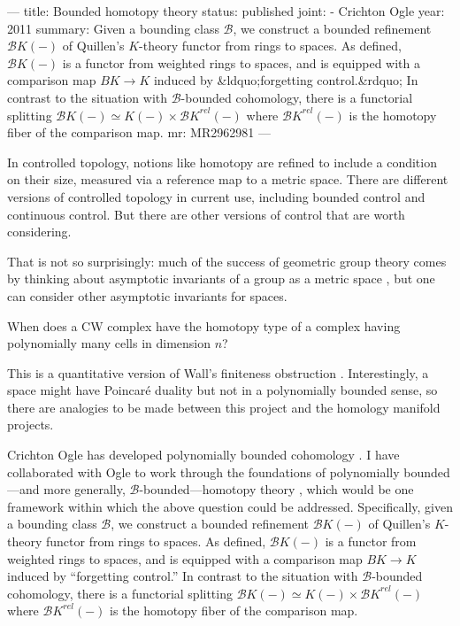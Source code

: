 ---
title: Bounded homotopy theory
status: published
joint:
  - Crichton Ogle
year: 2011
summary: Given a bounding class ${\mathcal B}$, we construct a bounded refinement ${\mathcal{B}K}(-)$ of Quillen's $K$-theory functor from rings to spaces. As defined, ${\mathcal{B}K}(-)$ is a functor from weighted rings to spaces, and is equipped with a comparison map $BK \to K$ induced by &ldquo;forgetting control.&rdquo; In contrast to the situation with $\mathcal{B}$-bounded cohomology, there is a functorial splitting ${\mathcal{B}K}(-) \simeq K(-) \times {\mathcal{B}K}^{rel}(-)$ where ${\mathcal{B}K}^{rel}(-)$ is the homotopy fiber of the comparison map.
mr: MR2962981
---

In controlled topology, notions like homotopy are refined to include a condition on their size, measured via a reference map to a metric space.  There are different versions of controlled topology in current use, including bounded control and continuous control. But there are other versions of control that are worth considering.

That is not so surprisingly: much of the success of geometric group theory comes by thinking about asymptotic invariants of a group as a metric space \cite{MR1253544}, but one can consider other asymptotic invariants for spaces.
\begin{question}
When does a CW complex have the homotopy type of a complex having polynomially many cells in dimension $n$?
\end{question}
This is a quantitative version of Wall's finiteness obstruction \cite{MR171284}.  Interestingly, a space might have Poincar\'e duality but not in a polynomially bounded sense, so there are analogies to be made between this project and the homology manifold projects.

Crichton Ogle has developed polynomially bounded cohomology \cite{MR2109110}.  I have collaborated with Ogle to work through the foundations of polynomially bounded---and more generally, $\mathcal{B}$-bounded---homotopy theory \cite{MR2962981}, which would be one framework within which the above question could be addressed. Specifically, given a bounding class $\mathcal{B}$, we construct a bounded refinement ${\mathcal{B} K}(-)$ of Quillen's $K$-theory functor from rings to spaces. As defined, ${\mathcal{B} K}(-)$ is a functor from weighted rings to spaces, and is equipped with a comparison map $BK \to K$ induced by ``forgetting control.''  In contrast to the situation with $\mathcal{B}$-bounded cohomology, there is a functorial splitting ${\mathcal{B} K}(-) \simeq K(-) \times {\mathcal{B} K}^{rel}(-)$ where ${\mathcal{B} K}^{rel}(-)$ is the homotopy fiber of the comparison map.

